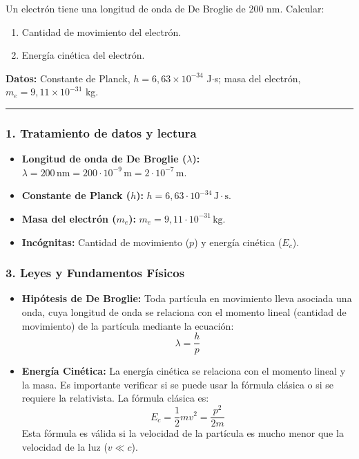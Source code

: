 \begin{cajaenunciado}
Un electrón tiene una longitud de onda de De Broglie de 200 nm. Calcular:
\begin{enumerate}
    \item Cantidad de movimiento del electrón.
    \item Energía cinética del electrón.
\end{enumerate}
\textbf{Datos:} Constante de Planck, $h=6,63\times10^{-34}$ J$\cdot$s; masa del electrón, $m_{e}=9,11\times10^{-31}$ kg.
\end{cajaenunciado}
\hrule

\subsubsection*{1. Tratamiento de datos y lectura}
\begin{itemize}
    \item \textbf{Longitud de onda de De Broglie ($\lambda$):} $\lambda = 200 \, \text{nm} = 200 \cdot 10^{-9} \, \text{m} = 2 \cdot 10^{-7} \, \text{m}$.
    \item \textbf{Constante de Planck ($h$):} $h = 6,63 \cdot 10^{-34} \, \text{J}\cdot\text{s}$.
    \item \textbf{Masa del electrón ($m_e$):} $m_e = 9,11 \cdot 10^{-31} \, \text{kg}$.
    \item \textbf{Incógnitas:} Cantidad de movimiento ($p$) y energía cinética ($E_c$).
\end{itemize}

\subsubsection*{3. Leyes y Fundamentos Físicos}
\begin{itemize}
    \item \textbf{Hipótesis de De Broglie:} Toda partícula en movimiento lleva asociada una onda, cuya longitud de onda se relaciona con el momento lineal (cantidad de movimiento) de la partícula mediante la ecuación:
    $$ \lambda = \frac{h}{p} $$
    \item \textbf{Energía Cinética:} La energía cinética se relaciona con el momento lineal y la masa. Es importante verificar si se puede usar la fórmula clásica o si se requiere la relativista. La fórmula clásica es:
    $$ E_c = \frac{1}{2}mv^2 = \frac{p^2}{2m} $$
    Esta fórmula es válida si la velocidad de la partícula es mucho menor que la velocidad de la luz ($v \ll c$).
\end{itemize}

